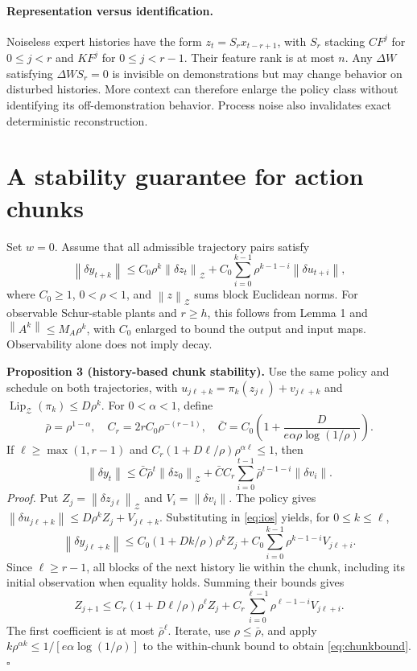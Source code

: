 \documentclass{l4dc2026}
\newcommand{\norm}[1]{\left\lVert#1\right\rVert}
\begin{document}
\paragraph{Representation versus identification.}
Noiseless expert histories have the form $z_t=S_rx_{t-r+1}$, with $S_r$ stacking $CF^j$ for $0\le j<r$ and $KF^j$ for $0\le j<r-1$. Their feature rank is at most $n$. Any $\Delta W$ satisfying $\Delta WS_r=0$ is invisible on demonstrations but may change behavior on disturbed histories. More context can therefore enlarge the policy class without identifying its off-demonstration behavior. Process noise also invalidates exact deterministic reconstruction.

\clearpage
\section{A stability guarantee for action chunks}
Set $w=0$. Assume that all admissible trajectory pairs satisfy
\begin{equation}
\norm{\delta y_{t+k}}\le C_0\rho^k\norm{\delta z_t}_{\mathcal Z}
+C_0\sum_{i=0}^{k-1}\rho^{k-1-i}\norm{\delta u_{t+i}},
\label{eq:ios}
\end{equation}
where $C_0\ge1$, $0<\rho<1$, and $\norm{z}_{\mathcal Z}$ sums block Euclidean norms. For observable Schur-stable plants and $r\ge h$, this follows from Lemma 1 and $\norm{A^k}\le M_A\rho^k$, with $C_0$ enlarged to bound the output and input maps. Observability alone does not imply decay.

\textbf{Proposition 3 (history-based chunk stability).} Use the same policy and schedule on both trajectories, with $u_{j\ell+k}=\pi_k(z_{j\ell})+v_{j\ell+k}$ and $\operatorname{Lip}_{\mathcal Z}(\pi_k)\le D\rho^k$. For $0<\alpha<1$, define
\[
\bar\rho=\rho^{1-\alpha},\quad C_r=2rC_0\rho^{-(r-1)},\quad
\bar C=C_0\left(1+\frac{D}{e\alpha\rho\log(1/\rho)}\right).
\]
If $\ell\ge\max(1,r-1)$ and $C_r(1+D\ell/\rho)\rho^{\alpha\ell}\le1$, then
\begin{equation}
\norm{\delta y_t}\le\bar C\bar\rho^t\norm{\delta z_0}_{\mathcal Z}
+\bar CC_r\sum_{i=0}^{t-1}\bar\rho^{t-1-i}\norm{\delta v_i}.
\label{eq:chunkbound}
\end{equation}
\emph{Proof.} Put $Z_j=\norm{\delta z_{j\ell}}_{\mathcal Z}$ and $V_i=\norm{\delta v_i}$. The policy gives $\norm{\delta u_{j\ell+k}}\le D\rho^kZ_j+V_{j\ell+k}$. Substituting in \eqref{eq:ios} yields, for $0\le k\le\ell$,
\[
\norm{\delta y_{j\ell+k}}\le C_0(1+Dk/\rho)\rho^kZ_j
+C_0\sum_{i=0}^{k-1}\rho^{k-1-i}V_{j\ell+i}.
\]
Since $\ell\ge r-1$, all blocks of the next history lie within the chunk, including its initial observation when equality holds. Summing their bounds gives
\[
Z_{j+1}\le C_r(1+D\ell/\rho)\rho^\ell Z_j
+C_r\sum_{i=0}^{\ell-1}\rho^{\ell-1-i}V_{j\ell+i}.
\]
The first coefficient is at most $\bar\rho^\ell$. Iterate, use $\rho\le\bar\rho$, and apply $k\rho^{\alpha k}\le1/[e\alpha\log(1/\rho)]$ to the within-chunk bound to obtain \eqref{eq:chunkbound}. $\square$
\end{document}
